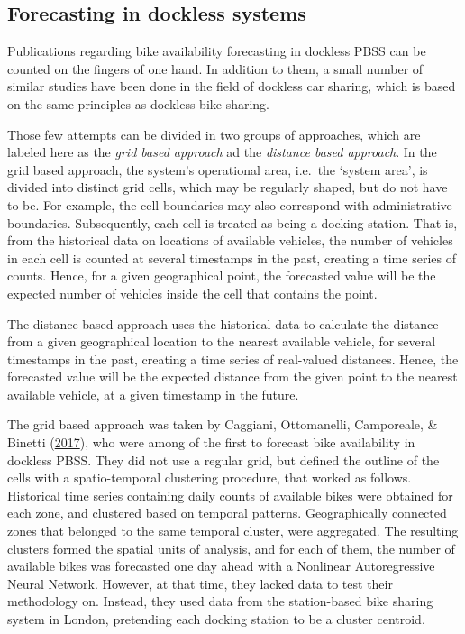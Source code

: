 \documentclass[12pt,oneside]{reedthesis}
\begin{document}
\subsection{Forecasting in dockless
systems}\label{forecasting-in-dockless-systems}

Publications regarding bike availability forecasting in dockless PBSS
can be counted on the fingers of one hand. In addition to them, a small
number of similar studies have been done in the field of dockless car
sharing, which is based on the same principles as dockless bike sharing.

Those few attempts can be divided in two groups of approaches, which are
labeled here as the \emph{grid based approach} ad the \emph{distance
based approach}. In the grid based approach, the system's operational
area, i.e.~the `system area', is divided into distinct grid cells, which
may be regularly shaped, but do not have to be. For example, the cell
boundaries may also correspond with administrative boundaries.
Subsequently, each cell is treated as being a docking station. That is,
from the historical data on locations of available vehicles, the number
of vehicles in each cell is counted at several timestamps in the past,
creating a time series of counts. Hence, for a given geographical point,
the forecasted value will be the expected number of vehicles inside the
cell that contains the point.

The distance based approach uses the historical data to calculate the
distance from a given geographical location to the nearest available
vehicle, for several timestamps in the past, creating a time series of
real-valued distances. Hence, the forecasted value will be the expected
distance from the given point to the nearest available vehicle, at a
given timestamp in the future.

The grid based approach was taken by Caggiani, Ottomanelli, Camporeale,
\& Binetti (\protect\hyperlink{ref-caggiani2017}{2017}), who were among
of the first to forecast bike availability in dockless PBSS. They did
not use a regular grid, but defined the outline of the cells with a
spatio-temporal clustering procedure, that worked as follows. Historical
time series containing daily counts of available bikes were obtained for
each zone, and clustered based on temporal patterns. Geographically
connected zones that belonged to the same temporal cluster, were
aggregated. The resulting clusters formed the spatial units of analysis,
and for each of them, the number of available bikes was forecasted one
day ahead with a Nonlinear Autoregressive Neural Network. However, at
that time, they lacked data to test their methodology on. Instead, they
used data from the station-based bike sharing system in London,
pretending each docking station to be a cluster centroid.
\end{document}
